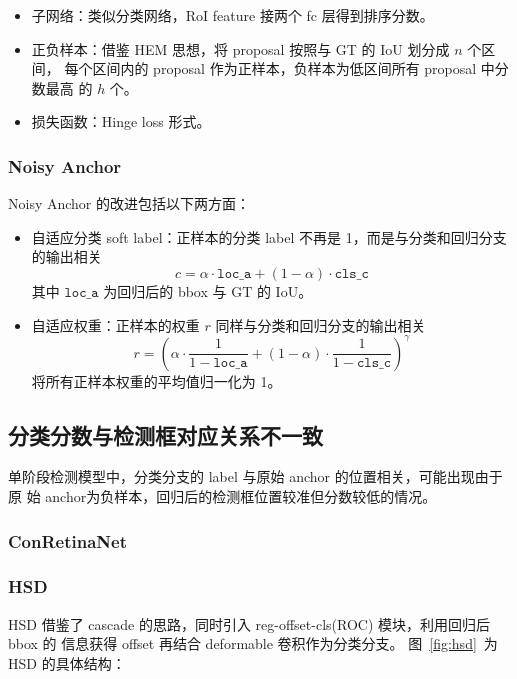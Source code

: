 \begin{itemize}
  \item 子网络：类似分类网络，RoI feature 接两个 fc 层得到排序分数。
  \item 正负样本：借鉴 HEM 思想，将 proposal 按照与 GT 的 IoU 划分成 $n$ 个区间，
    每个区间内的 proposal 作为正样本，负样本为低区间所有 proposal 中分数最高
    的 $h$ 个。
  \item 损失函数：Hinge loss 形式。
\end{itemize}

\subsubsection{Noisy Anchor}
Noisy Anchor 的改进包括以下两方面：

\begin{itemize}
  \item 自适应分类 soft label：正样本的分类 label 不再是 1，而是与分类和回归分支
    的输出相关
    \begin{equation}
      c = \alpha \cdot \mathtt{loc\_a} + (1 - \alpha) \cdot \mathtt{cls\_c}
    \end{equation}
    其中 $\mathtt{loc\_a}$ 为回归后的 bbox 与 GT 的 IoU。
  \item 自适应权重：正样本的权重 $r$ 同样与分类和回归分支的输出相关
    \begin{equation}
      r = \left( \alpha \cdot \frac{1}{1-\mathtt{loc\_a}} + (1 - \alpha) \cdot \frac{1}{1-\mathtt{cls\_c}} \right ) ^ {\gamma}
    \end{equation}
    将所有正样本权重的平均值归一化为 1。
\end{itemize}

\subsection{分类分数与检测框对应关系不一致}
单阶段检测模型中，分类分支的 label 与原始 anchor 的位置相关，可能出现由于原
始 anchor为负样本，回归后的检测框位置较准但分数较低的情况。

\subsubsection{ConRetinaNet}

\subsubsection{HSD}
HSD 借鉴了 cascade 的思路，同时引入 reg-offset-cls(ROC) 模块，利用回归后 bbox 的
信息获得 offset 再结合 deformable 卷积作为分类分支。
图~\ref{fig:hsd}~为 HSD 的具体结构：

